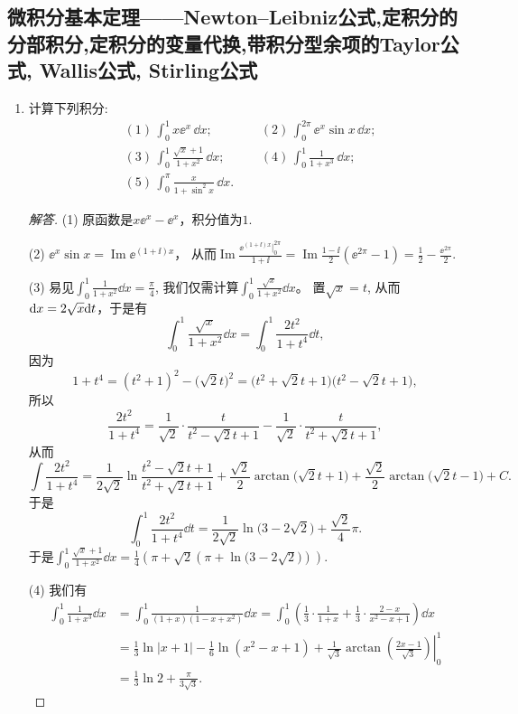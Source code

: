 \subsection{微积分基本定理------Newton--Leibniz公式,定积分的分部积分,定积分的变量代换,带积分型余项的Taylor公式, Wallis公式, Stirling公式}
\begin{quiza}
\begin{enumerate}
\item 计算下列积分:
\begin{align*}
&(1)\,\int_{0}^{1}x\ee^x\,\dd x;\qquad&(2)\,\int_{0}^{2\pi}\ee^x\sin x\,\dd x;\\
&(3)\,\int_{0}^{1}\frac{\sqrt{x}+1}{1+x^2}\,\dd x;\qquad&(4)\,\int_{0}^{1}\frac{1}{1+x^3}\,\dd x;\\
&(5)\,\int_{0}^{\pi}\frac{x}{1+\sin^2x}\,\dd x.&
\end{align*}
\begin{proof}[解答]
(1) 原函数是\(x\ee^x-\ee^x\)，积分值为\(1\).

(2) \(\ee^x\sin x=\operatorname{Im}\ee^{(1+\ii)x}\)，
从而\(\operatorname{Im}\frac{\ee^{(1+\ii)x}|_{0}^{2\pi}}{1+\ii}
=\operatorname{Im}\frac{1-\ii}{2}(\ee^{2\pi}-1)=\frac{1}{2}-\frac{\ee^{2\pi}}{2}\).

(3) 易见\(\int_{0}^{1}\frac{1}{1+x^2}\dd x=\frac{\pi}{4}\), 
我们仅需计算\(\int_{0}^{1}\frac{\sqrt{x}}{1+x^2}\dd x\)。
置\(\sqrt{x}=t\), 从而${\rm d}x=2\sqrt{x}{\rm d}t$，于是有
\[\int_{0}^{1}\frac{\sqrt{x}}{1+x^2}\dd x
=\int_{0}^{1}\frac{2t^2}{1+t^4}\dd t,\]
因为
\[1+t^4=(t^2+1)^2-\big(\sqrt{2}t\big)^2
=\big(t^2+\sqrt{2}t+1\big)\big(t^2-\sqrt{2}t+1\big),\]
所以\[\frac{2t^2}{1+t^4}=\frac{1}{\sqrt{2}}\cdot\frac{t}{t^2-\sqrt{2}t+1}-\frac{1}{\sqrt{2}}\cdot\frac{t}{t^2+\sqrt{2}t+1},\]
从而\[\int\frac{2t^2}{1+t^4}=\frac{1}{2\sqrt{2}}\ln\frac{t^2-\sqrt{2}t+1}{t^2+\sqrt{2}t+1}
+\frac{\sqrt{2}}{2}\arctan\big(\sqrt{2}t+1\big)
+\frac{\sqrt{2}}{2}\arctan\big(\sqrt{2}t-1\big)+C.\]
于是\[\int_{0}^{1}\frac{2t^2}{1+t^4}\dd t
=\frac{1}{2\sqrt{2}}\ln\big(3-2\sqrt{2}\big)+\frac{\sqrt{2}}{4}\pi.\]
于是\(\int_{0}^{1}\frac{\sqrt{x}+1}{1+x^2}\dd x
=\frac{1}{4}\left(\pi+\sqrt{2}\left(\pi+\ln\big(3-2\sqrt{2}\big)\right)\right)\).

(4) 我们有\[\begin{split}
\int_{0}^{1}\frac{1}{1+x^3}\dd x&=\int_{0}^{1}\frac{1}{(1+x)(1-x+x^2)}\dd x
=\int_{0}^{1}\left(\frac{1}{3}\cdot\frac{1}{1+x}
+\frac{1}{3}\cdot\frac{2-x}{x^2-x+1}\right)\dd x\\
&=\left.\frac{1}{3}\ln\left|x+1\right|-\frac{1}{6}\ln(x^2-x+1)+\frac{1}{\sqrt{3}}\arctan\left(\frac{2x-1}{\sqrt{3}}\right)\right|^1_0\\
&=\frac{1}{3}\ln 2+\frac{\pi}{3\sqrt{3}}.
\end{split}\]


\end{proof}
\end{enumerate}
\end{quiza}

